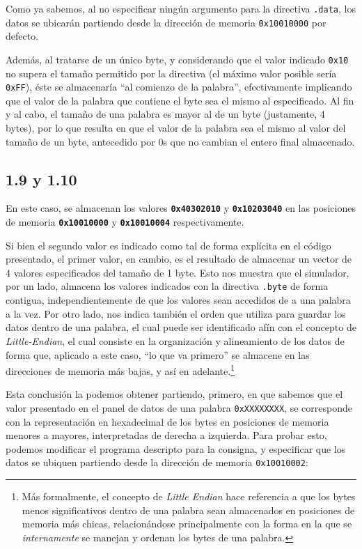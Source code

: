\documentclass[a4paper]{report}
\begin{document}
Como ya sabemos, al no especificar ningún argumento para la directiva \texttt{.data}, los datos se ubicarán partiendo desde la dirección de memoria \texttt{0x10010000} por defecto.

Además, al tratarse de un único byte, y considerando que el valor indicado \texttt{0x10} no supera el tamaño permitido por la directiva (el máximo valor posible sería \texttt{0xFF}), éste se almacenaría ``al comienzo de la palabra'', efectivamente implicando que el valor de la palabra que contiene el byte sea el mismo al especificado. Al fin y al cabo, el tamaño de una palabra es mayor al de un byte (justamente, 4 bytes), por lo que resulta en que el valor de la palabra sea el mismo al valor del tamaño de un byte, antecedido por 0s que no cambian el entero final almacenado.

\subsection*{1.9 y 1.10}
\label{sec:c1-10}

En este caso, se almacenan los valores \textbf{\texttt{0x40302010}} y \textbf{\texttt{0x10203040}} en las posiciones de memoria \textbf{\texttt{0x10010000}} y \textbf{\texttt{0x10010004}} respectivamente.

Si bien el segundo valor es indicado como tal de forma explícita en el código presentado, el primer valor, en cambio, es el resultado de almacenar un vector de 4 valores especificados del tamaño de 1 byte. Esto nos muestra que el simulador, por un lado, almacena los valores indicados con la directiva \texttt{.byte} de forma contigua, independientemente de que los valores sean accedidos de a una palabra a la vez. Por otro lado, nos indica también el orden que utiliza para guardar los datos dentro de una palabra, el cual puede ser identificado afín con el concepto de \textit{Little-Endian}, el cual consiste en la organización y alineamiento de los datos de forma que, aplicado a este caso, ``lo que va primero'' se almacene en las direcciones de memoria más bajas, y así en adelante.\footnote{Más formalmente, el concepto de \textit{Little Endian} hace referencia a que los bytes menos significativos dentro de una palabra sean almacenados en posiciones de memoria más chicas, relacionándose principalmente con la forma en la que se \textit{internamente} se manejan y ordenan los bytes de una palabra.}

Esta conclusión la podemos obtener partiendo, primero, en que sabemos que el valor presentado en el panel de datos de una palabra \texttt{0xXXXXXXXX}, se corresponde con la representación en hexadecimal de los bytes en posiciones de memoria menores a mayores, interpretadas de derecha a izquierda. Para probar esto, podemos modificar el programa descripto para la consigna, y especificar que los datos se ubiquen partiendo desde la dirección de memoria \texttt{0x10010002}:
\end{document}
